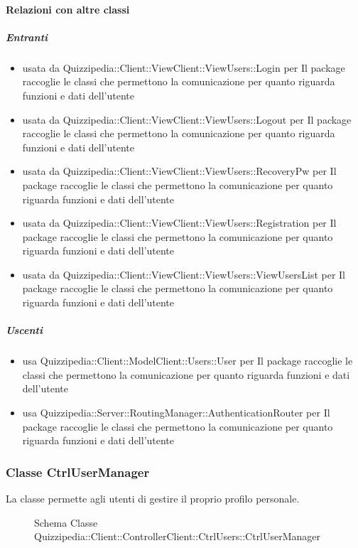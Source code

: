 \paragraph{Relazioni con altre classi}
\subparagraph{Entranti}
\begin{itemize}
\item usata da Quizzipedia::Client::ViewClient::ViewUsers::Login per Il package raccoglie le classi che permettono la comunicazione per quanto riguarda funzioni e dati dell'utente
\item usata da Quizzipedia::Client::ViewClient::ViewUsers::Logout per Il package raccoglie le classi che permettono la comunicazione per quanto riguarda funzioni e dati dell'utente
\item usata da Quizzipedia::Client::ViewClient::ViewUsers::RecoveryPw per Il package raccoglie le classi che permettono la comunicazione per quanto riguarda funzioni e dati dell'utente
\item usata da Quizzipedia::Client::ViewClient::ViewUsers::Registration per Il package raccoglie le classi che permettono la comunicazione per quanto riguarda funzioni e dati dell'utente
\item usata da Quizzipedia::Client::ViewClient::ViewUsers::ViewUsersList per Il package raccoglie le classi che permettono la comunicazione per quanto riguarda funzioni e dati dell'utente
\end{itemize}
\subparagraph{Uscenti}
\begin{itemize}
\item usa Quizzipedia::Client::ModelClient::Users::User per Il package raccoglie le classi che permettono la comunicazione per quanto riguarda funzioni e dati dell'utente
\item usa Quizzipedia::Server::RoutingManager::AuthenticationRouter per Il package raccoglie le classi che permettono la comunicazione per quanto riguarda funzioni e dati dell'utente
\end{itemize}
\subsubsection{Classe CtrlUserManager}
La classe permette agli utenti di gestire il proprio profilo personale.
\begin{figure}[H]
\centering
\noindent{}
\caption[Schema Classe CtrlUserManager]{Schema Classe Quizzipedia::Client::ControllerClient::CtrlUsers::CtrlUserManager}
\end{figure}
